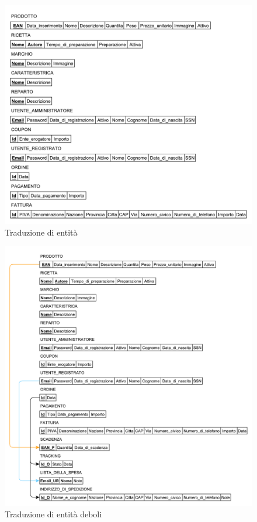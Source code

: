 	\begin{figure}[h]
		\centering
		\includegraphics[width=1\textwidth]
		{immagini/traduzione-entita}
		
		\caption{Traduzione di entità}
	\end{figure}
	
	\begin{figure}[h]
		\centering
		\includegraphics[width=1\textwidth]
		{immagini/traduzione-entita-deboli}
		
		\caption{Traduzione di entità deboli}
	\end{figure}
	

